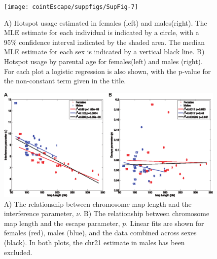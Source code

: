 \begin{figure}[!h]
    \texttt{[image: cointEscape/suppfigs/SupFig-7]}
    \vspace{-10pt}
    \caption[\textbf{Hotspot usage between sexes.}]{
        A) Hotspot usage estimated in females (left) and males(right). 
        The MLE estimate for each individual is indicated by a circle, with a 95\% confidence interval indicated by the shaded area.
        The median MLE estimate for each sex is indicated by a vertical black line.
        B) Hotspot usage by parental age for females(left) and males (right).
        For each plot a logistic regression is also shown, with the p-value for the non-constant term given in the title.  
       \label{fig:cointFS7}}
\end{figure}

\begin{figure}[!h]
    \includegraphics[width=\textwidth]{cointEscape/suppfigs/SupFig-8}
    \vspace{-10pt}
    \caption[\textbf{The relationship between map length and interference parameters.}]{ 
        A) The relationship between chromosome map length and the interference parameter, $\nu$.
        B) The relationship between chromosome map length and the escape parameter, $p$.
        Linear fits are shown for females (red), males (blue), and the data combined across sexes (black).
        In both plots, the chr21 estimate in males has been excluded.  
       \label{fig:cointFS8}}
\end{figure}

